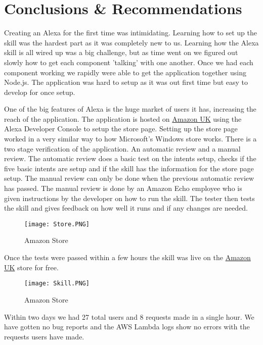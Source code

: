 \chapter{Conclusions \& Recommendations}
Creating an Alexa for the first time was intimidating. Learning how to set up the skill was the hardest part as it was completely new to us. Learning how the Alexa skill is all wired up was a big challenge, but as time went on we figured out slowly how to get each component 'talking' with one another. Once we had each component working we rapidly were able to get the application together using Node.js. The application was hard to setup as it was out first time but easy to develop for once setup.

One of the big features of Alexa is the huge market of users it has, increasing the reach of the application. The application is hosted on \hyperlink{https://www.amazon.co.uk/Cian-GameFinder/dp/B07QH4N2GG}{Amazon UK} using the Alexa Developer Console to setup the store page. Setting up the store page worked in a very similar way to how Microsoft's Windows store works. There is a two stage verification of the application. An automatic review and a manual review. The automatic review does a basic test on the intents setup, checks if the five basic intents are setup and if the skill has the information for the store page setup. The manual review can only be done when the previous automatic review has passed. The manual review is done by an Amazon Echo employee who is given instructions by the developer on how to run the skill. The tester then tests the skill and gives feedback on how well it runs and if any changes are needed.

\begin{figure}[h!]
  \texttt{[image: Store.PNG]}
  \caption{Amazon Store}
  \label{fig:amazonstore}
\end{figure}

Once the tests were passed within a few hours the skill was live on the \hyperlink{https://www.amazon.co.uk/Cian-GameFinder/dp/B07QH4N2GG}{Amazon UK} store for free.

\begin{figure}[h!]
  \texttt{[image: Skill.PNG]}
  \caption{Amazon Store}
  \label{fig:amazonstore}
\end{figure}

Within two days we had 27 total users and 8 requests made in a single hour. We have gotten no bug reports and the AWS Lambda logs show no errors with the requests users have made.

